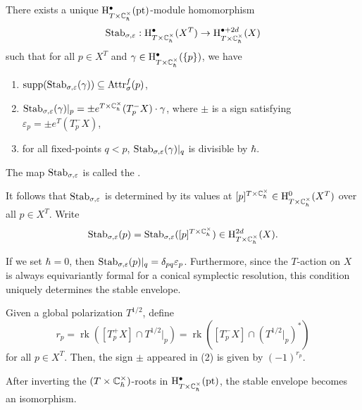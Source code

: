 \begin{theorem}{}
    There exists a unique $\mathrm{H}^\bullet_{T\times \mathbb{C}^\times _\hbar}(\mathrm{pt})$-module homomorphism
    \[
        \mathrm{Stab}_{\sigma,\varepsilon} : \mathrm{H}^\bullet_{T \times \mathbb{C}^\times _\hbar}(X^T) \to \mathrm{H}^{\bullet+2d}_{T \times \mathbb{C}^\times _\hbar}(X)
    \]
    such that for all $p \in X^T$ and $\gamma \in \mathrm{H}^\bullet_{T \times \mathbb{C}^\times _\hbar}(\{p\})$, we have
    \begin{enumerate}
        \item $\mathrm{supp}(\mathrm{Stab}_{\sigma,\varepsilon}(\gamma)) \subseteq \mathrm{Attr}^f_\sigma(p)$,
        \item $\mathrm{Stab}_{\sigma,\varepsilon}(\gamma)|_p = \pm e^{T \times \mathbb{C}^\times _\hbar}(T_p^-X)\cdot\gamma$, where $\pm$ is a sign satisfying $\varepsilon_p = \pm e^T(T_p^-X)$,
        \item for all fixed-points $q < p$, $\mathrm{Stab}_{\sigma,\varepsilon}(\gamma)|_q$ is divisible by $\hbar$.
    \end{enumerate}
    The map $\mathrm{Stab}_{\sigma,\varepsilon}$ is called the .
\end{theorem}

\begin{remark}
    It follows that $\mathrm{Stab}_{\sigma,\varepsilon}$ is determined by its values at $[p]^{T \times \mathbb{C}^\times_\hbar} \in \mathrm{H}^0_{T \times \mathbb{C}^\times _\hbar}(X^T)$ over all $p \in X^T$. Write
    \[
        \mathrm{Stab}_{\sigma,\varepsilon}(p)
        =
        \mathrm{Stab}_{\sigma,\varepsilon}([p]^{T \times \mathbb{C}^\times_\hbar})
        \in
        \mathrm{H}^{2d}_{T \times \mathbb{C}^\times _\hbar}(X).
    \]
\end{remark}

\begin{remark}
    If we set $\hbar = 0$, then $\mathrm{Stab}_{\sigma,\varepsilon}(p)|_q = \delta_{pq}\varepsilon_p$. Furthermore, since the $T$-action on $X$ is always equivariantly formal for a conical symplectic resolution, this condition uniquely determines the stable envelope.
\end{remark}

\begin{remark}
    Given a global polarization $T^{1/2}$, define
    \[
        r_p
        =
        \operatorname{rk}([T_p^+X] \cap T^{1/2}|_p)
        =
        \operatorname{rk}([T_p^-X] \cap (T^{1/2}|_p)^*)
    \]
    for all $p \in X^T$. Then, the sign $\pm$ appeared in (2) is given by $(-1)^{r_p}$.
\end{remark}

\begin{theorem}{}
    After inverting the $(T \times \mathbb{C}^\times _\hbar)$-roots in
    $\mathrm{H}^\bullet_{T\times \mathbb{C}^\times _\hbar}(\mathrm{pt})$, the stable envelope
    becomes an isomorphism.
\end{theorem}

